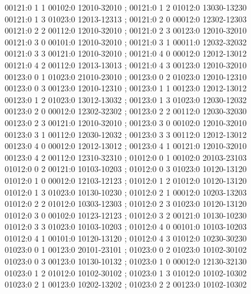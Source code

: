 \documentclass[11pt]{article}
\theoremstyle{remark}
\numberwithin{equation}{section}
\numberwithin{table}{section}
\begin{document}
\begin{flushleft}
00121:0 1 1 00102:0 12010-32010 ; 00121:0 1 2 01012:0 13030-13230\\
00121:0 1 3 01023:0 12013-12313 ; 00121:0 2 0 00012:0 12302-12303\\
00121:0 2 2 00112:0 12010-32010 ; 00121:0 2 3 00123:0 12010-32010\\
00121:0 3 0 00101:0 12010-32010 ; 00121:0 3 1 00011:0 12032-32032\\
00121:0 3 3 00121:0 12010-32010 ; 00121:0 4 0 00012:0 12012-13012\\
00121:0 4 2 00112:0 12013-13013 ; 00121:0 4 3 00123:0 12010-32010\\
00123:0 0 1 01023:0 21010-23010 ; 00123:0 0 2 01023:0 12010-12310\\
00123:0 0 3 00123:0 12010-12310 ; 00123:0 1 1 00123:0 12012-13012\\
00123:0 1 2 01023:0 13012-13032 ; 00123:0 1 3 01023:0 12030-12032\\
00123:0 2 0 00012:0 12302-32302 ; 00123:0 2 2 00112:0 12030-32030\\
00123:0 2 3 00121:0 12010-32010 ; 00123:0 3 0 00102:0 12010-32010\\
00123:0 3 1 00112:0 12030-12032 ; 00123:0 3 3 00112:0 12012-13012\\
00123:0 4 0 00012:0 12012-13012 ; 00123:0 4 1 00121:0 12010-32010\\
00123:0 4 2 00112:0 12310-32310 ; 01012:0 0 1 00102:0 20103-23103\\
01012:0 0 2 00121:0 10103-10203 ; 01012:0 0 3 01023:0 10120-13120\\
01012:0 1 0 00012:0 12103-12123 ; 01012:0 1 2 01012:0 10120-13120\\
01012:0 1 3 01023:0 10130-10230 ; 01012:0 2 1 00012:0 10203-13203\\
01012:0 2 2 01012:0 10303-12303 ; 01012:0 2 3 01023:0 10120-13120\\
01012:0 3 0 00102:0 10123-12123 ; 01012:0 3 2 00121:0 10130-10230\\
01012:0 3 3 01023:0 10103-10203 ; 01012:0 4 0 00101:0 10103-10203\\
01012:0 4 1 00101:0 10120-13120 ; 01012:0 4 3 01012:0 10230-30230\\
01023:0 0 1 00123:0 20101-23101 ; 01023:0 0 2 01023:0 10102-30102\\
01023:0 0 3 00123:0 10130-10132 ; 01023:0 1 0 00012:0 12130-32130\\
01023:0 1 2 01012:0 10102-30102 ; 01023:0 1 3 01012:0 10102-10302\\
01023:0 2 1 00123:0 10202-13202 ; 01023:0 2 2 00123:0 10102-10302\\

\end{flushleft}
\end{document}
